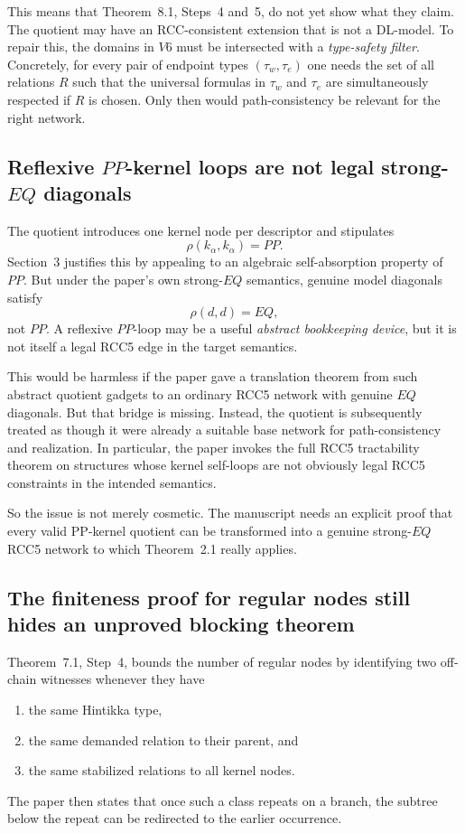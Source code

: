 \documentclass[11pt]{article}
\begin{document}
This means that Theorem~8.1, Steps~4 and~5, do not yet show what they claim. The quotient may have an RCC-consistent extension that is not a DL-model. To repair this, the domains in $V6$ must be intersected with a \emph{type-safety filter}. Concretely, for every pair of endpoint types $(\tau_w,\tau_e)$ one needs the set of all relations $R$ such that the universal formulas in $\tau_w$ and $\tau_e$ are simultaneously respected if $R$ is chosen. Only then would path-consistency be relevant for the right network.

\subsection{Reflexive $PP$-kernel loops are not legal strong-$EQ$ diagonals}

The quotient introduces one kernel node per descriptor and stipulates
\[
\rho(k_\alpha,k_\alpha)=PP.
\]
Section~3 justifies this by appealing to an algebraic self-absorption property of $PP$. But under the paper's own strong-$EQ$ semantics, genuine model diagonals satisfy
\[
\rho(d,d)=EQ,
\]
not $PP$. A reflexive $PP$-loop may be a useful \emph{abstract bookkeeping device}, but it is not itself a legal RCC5 edge in the target semantics.

This would be harmless if the paper gave a translation theorem from such abstract quotient gadgets to an ordinary RCC5 network with genuine $EQ$ diagonals. But that bridge is missing. Instead, the quotient is subsequently treated as though it were already a suitable base network for path-consistency and realization. In particular, the paper invokes the full RCC5 tractability theorem on structures whose kernel self-loops are not obviously legal RCC5 constraints in the intended semantics.

So the issue is not merely cosmetic. The manuscript needs an explicit proof that every valid PP-kernel quotient can be transformed into a genuine strong-$EQ$ RCC5 network to which Theorem~2.1 really applies.

\subsection{The finiteness proof for regular nodes still hides an unproved blocking theorem}

Theorem~7.1, Step~4, bounds the number of regular nodes by identifying two off-chain witnesses whenever they have
\begin{enumerate}[label=(\roman*)]
  \item the same Hintikka type,
  \item the same demanded relation to their parent, and
  \item the same stabilized relations to all kernel nodes.
\end{enumerate}
The paper then states that once such a class repeats on a branch, the subtree below the repeat can be redirected to the earlier occurrence.
\end{document}
